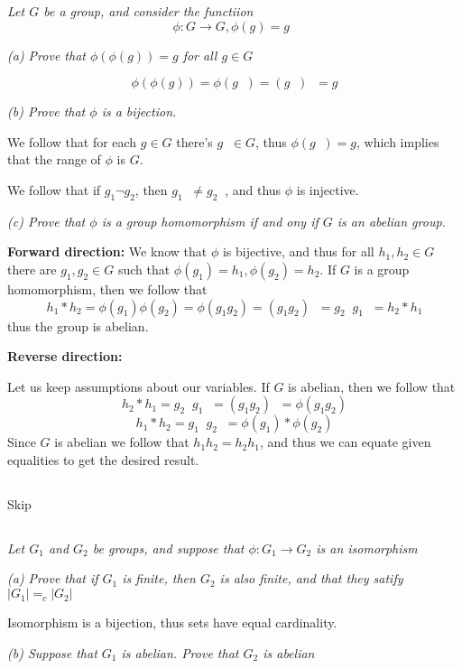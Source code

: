 \documentclass[11pt,oneside,titlepage]{book}
\DeclareMathOperator \inv {^{-1}}
\begin{document}
\textit{Let $G$ be a group, and consider the functiion
  $$\phi: G \to G, \phi(g) = g\inv$$
}

\textit{(a) Prove that $\phi(\phi(g)) = g$ for all $g \in G$}

$$\phi(\phi(g)) = \phi(g\inv) = (g\inv)\inv = g$$

\textit{(b) Prove that $\phi$ is a bijection.}

We follow that for each $g \in G$ there's $g\inv \in G$, thus
$\phi(g\inv) = g$, which implies that the range of $\phi$ is $G$.

We follow that if $g_1 \neg g_2$, then $g_1\inv \neq g_2\inv$, and
thus $\phi$ is injective.

\textit{(c) Prove that $\phi$ is a group homomorphism if and ony if
$G$ is an abelian group.}

\textbf{Forward direction:} We know that $\phi$ is bijective, and thus
for all $h_1, h_2 \in G$ there are $g_1, g_2 \in G$ such that
$\phi(g_1) = h_1, \phi(g_2) = h_2$. If $G$ is a group homomorphism,
then we follow that
$$h_1 * h_2 = \phi(g_1) \phi(g_2) = \phi(g_1 g_2) = (g_1 g_2)\inv = g_2\inv g_1 \inv = h_2 * h_1$$
thus the group is abelian.

\textbf{Reverse direction:}

Let us keep assumptions about our variables. If $G$ is abelian, then
we follow that
$$h_2 * h_1 = g_2\inv g_1 \inv  =  (g_1 g_2)\inv  = \phi(g_1 g_2)$$
$$h_1 * h_2 = g_1\inv g_2 \inv  =  \phi(g_1) * \phi(g_2)$$
Since $G$ is abelian we follow that $h_1 h_2 = h_2 h_1$, and thus we
can equate given equalities to get the desired result.

\subsection{}

Skip

\subsection{}

\textit{Let $G_1$ and $G_2$ be groups, and suppose that $\phi: G_1 \to
G_2$ is an isomorphism}

\textit{(a) Prove that if $G_1$ is finite, then $G_2$ is also finite,
and that they satify $|G_1| =_c |G_2|$}

Isomorphism is a bijection, thus sets have equal cardinality.

\textit{(b) Suppose that $G_1$ is abelian. Prove that $G_2$ is
abelian}
\end{document}
